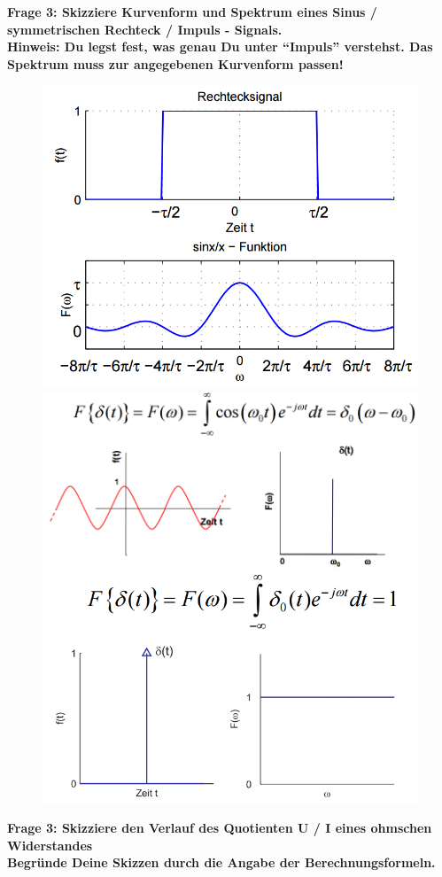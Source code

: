 \documentclass[11pt,a4paper]{scrartcl}
\begin{document}
\textbf{Frage 3: Skizziere Kurvenform und Spektrum eines Sinus / symmetrischen Rechteck / Impuls - Signals.\\
Hinweis: Du legst fest, was genau Du unter "`Impuls"' verstehst. Das Spektrum muss zur angegebenen Kurvenform passen!}\\
\begin{figure}[H]
  \includegraphics[width=\linewidth]{rechteck.png}
\endminipage\hfill
{}
  \includegraphics[width=\linewidth]{sinus.png}
\endminipage\hfill
{}
  \includegraphics[width=\linewidth]{impuls.png}
\endminipage
\end{figure}
\textbf{Frage 3: Skizziere den Verlauf des Quotienten U / I eines ohmschen Widerstandes}\\
\textbf{Begründe Deine Skizzen durch die Angabe der Berechnungsformeln.}\\
\end{document}
